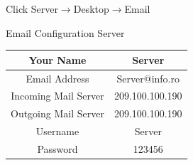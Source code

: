 \documentclass{article}
\begin{document}
Click Server$\rightarrow$Desktop$\rightarrow$Email

\begin{center}
    Email Configuration Server
\end{center}
\begin{center}
    \begin{tabular}{|c|c|}\hline
         Your Name & Server  \\ \hline 
         Email Address & Server@info.ro  \\ \hline
         Incoming Mail Server & 209.100.100.190 \\ \hline
         Outgoing Mail Server & 209.100.100.190 \\ \hline
         Username & Server \\ \hline
         Password & 123456 \\ \hline
    \end{tabular}
\end{center}
\end{document}
